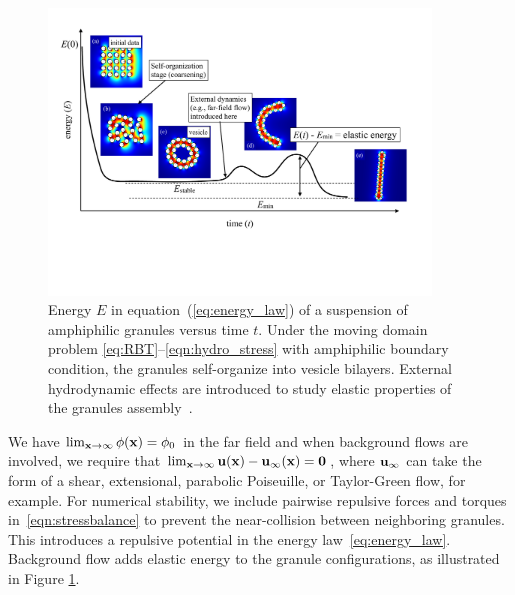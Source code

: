 \begin{figure} 
  \includegraphics[width=4in]{figures/Background/coarsening.pdf}
  \vspace{-30pt}
  \caption{\label{fig:coarsening} \footnotesize Energy $E$ in
  equation~(\ref{eq:energy_law}) of a suspension of amphiphilic granules
  versus time $t$. Under the moving domain problem
  \eqref{eq:RBT}--\eqref{eqn:hydro_stress} with amphiphilic boundary
  condition, the granules self-organize into vesicle bilayers. External
  hydrodynamic effects are introduced to study elastic properties of
  the granules assembly~\cite{Fu2018_SIAM,FuQuRyYo22}.}
\end{figure}

We have $\lim_{\mathbf{x} \to \infty} \phi(\mathbf{x}) = \phi_0$ in the far field
and when
background flows are involved, we require that $\lim_{\mathbf{x} \to \infty} \mathbf{u}(\mathbf{x}) -
\mathbf{u}_{\infty}(\mathbf{x}) = \mathbf{0}$, where
$\mathbf{u}_{\infty}$ can take the form
of a shear, extensional, parabolic Poiseuille, or
Taylor-Green flow, for example.
For numerical stability, we
include pairwise repulsive forces and torques
in~\eqref{eqn:stressbalance} to prevent the near-collision between
neighboring granules.  This introduces a repulsive potential in the energy
law~\eqref{eq:energy_law}.
Background flow adds elastic energy to the granule configurations,
as illustrated in Figure \ref{fig:coarsening}.

